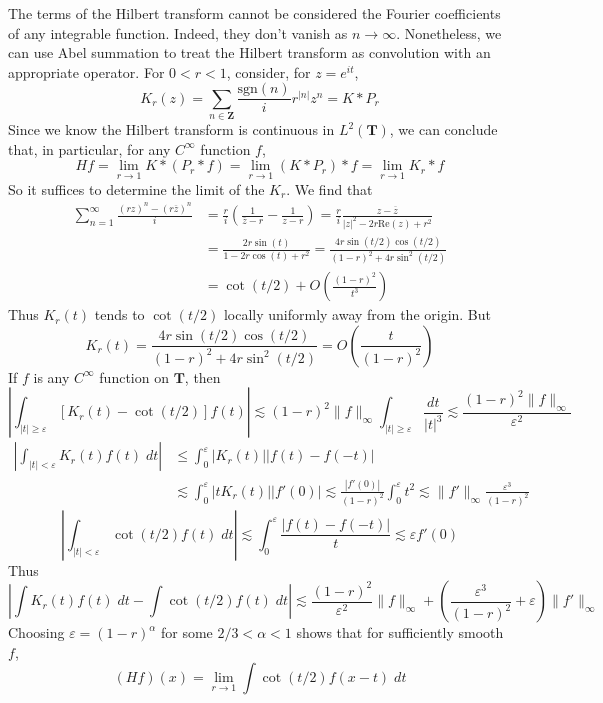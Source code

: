 The terms of the Hilbert transform cannot be considered the Fourier coefficients of any integrable function. Indeed, they don't vanish as $n \to \infty$. Nonetheless, we can use Abel summation to treat the Hilbert transform as convolution with an appropriate operator. For $0 < r < 1$, consider, for $z = e^{it}$,
%
\[ K_r(z) = \sum_{n \in \mathbf{Z}} \frac{\text{sgn}(n)}{i} r^{|n|} z^n = K * P_r \]
%
Since we know the Hilbert transform is continuous in $L^2(\mathbf{T})$, we can conclude that, in particular, for any $C^\infty$ function $f$,
%
\[ H f = \lim_{r \to 1} K * (P_r * f) = \lim_{r \to 1} (K * P_r) * f = \lim_{r \to 1} K_r * f \]
%
So it suffices to determine the limit of the $K_r$. We find that
%
\begin{align*}
    \sum_{n = 1}^\infty \frac{(rz)^n - (r \overline{z})^n}{i} &= \frac{r}{i} \left( \frac{1}{\overline{z} - r} - \frac{1}{z - r} \right) = \frac{r}{i} \frac{z - \overline{z}}{|z|^2 - 2r \text{Re}(z) + r^2}\\
    &= \frac{2r \sin(t)}{1 - 2r \cos(t) + r^2} = \frac{4r \sin(t/2) \cos(t/2)}{(1 - r)^2 + 4r \sin^2(t/2)}\\
    &= \cot(t/2) + O \left( \frac{(1 - r)^2}{t^3} \right)
\end{align*}
%
Thus $K_r(t)$ tends to $\cot(t/2)$ locally uniformly away from the origin. But
%
\[ K_r(t) = \frac{4r \sin(t/2) \cos(t/2)}{(1 - r)^2 + 4r\sin^2(t/2)} = O \left( \frac{t}{(1 - r)^2} \right) \]
%
If $f$ is any $C^\infty$ function on $\mathbf{T}$, then
%
\[ \left| \int_{|t| \geq \varepsilon} [K_r(t) - \cot(t/2)] f(t) \right| \lesssim (1 - r)^2 \| f \|_\infty \int_{|t| \geq \varepsilon} \frac{dt}{|t|^3} \lesssim \frac{(1 - r)^2 \| f \|_\infty}{\varepsilon^2} \]
%
\begin{align*}
    \left| \int_{|t| < \varepsilon} K_r(t) f(t)\; dt \right| &\leq \int_0^\varepsilon |K_r(t)||f(t) - f(-t)|\\
    &\lesssim \int_0^\varepsilon |tK_r(t)||f'(0)| \lesssim \frac{|f'(0)|}{(1 - r)^2} \int_0^\varepsilon t^2 \lesssim \| f' \|_\infty \frac{\varepsilon^3}{(1 - r)^2}
\end{align*}
%
\[ \left| \int_{|t| < \varepsilon} \cot(t/2) f(t)\; dt \right| \lesssim \int_0^\varepsilon \frac{|f(t) - f(-t)|}{t} \lesssim \varepsilon f'(0) \]
%
Thus
%
\[ \left| \int K_r(t) f(t)\; dt - \int \cot(t/2) f(t)\; dt \right| \lesssim \frac{(1 - r)^2}{\varepsilon^2} \| f \|_\infty + \left( \frac{\varepsilon^3}{(1 - r)^2} + \varepsilon \right) \| f' \|_\infty \]
%
Choosing $\varepsilon = (1 - r)^\alpha$ for some $2/3 < \alpha < 1$ shows that for sufficiently smooth $f$,
%
\[ (Hf)(x) = \lim_{r \to 1} \int \cot(t/2) f(x - t)\; dt \]



